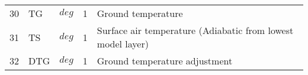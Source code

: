 \begin{tabular}{lllll}
30 & TG        &  $deg$ &  1
         &\begin{minipage}[t]{3in}
          {Ground temperature}
         \end{minipage}\\
31 & TS        &  $deg$ &  1
         &\begin{minipage}[t]{3in}
          {Surface air temperature (Adiabatic from lowest model layer)}
         \end{minipage}\\
32 & DTG       &  $deg$ &  1
         &\begin{minipage}[t]{3in}
          {Ground temperature adjustment}
         \end{minipage}\\

\end{tabular}

